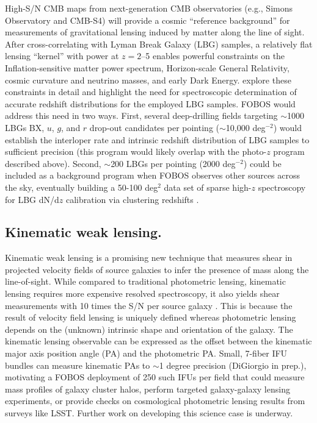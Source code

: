 High-S/N CMB maps from next-generation CMB observatories (e.g., Simons Observatory and CMB-S4) will provide a cosmic
``reference background'' for measurements of gravitational lensing induced by matter along the line of sight.  After
cross-correlating with Lyman Break Galaxy (LBG) samples, a relatively flat lensing ``kernel'' with power at $z = 2$--5
enables powerful constraints on the Inflation-sensitive matter power spectrum, Horizon-scale General Relativity, cosmic
curvature and neutrino masses, and early Dark Energy.  \citet{wilson19} explore these constraints in detail and
highlight the need for spectroscopic determination of accurate redshift distributions for the employed LBG samples.
FOBOS would address this need in two ways.  First, several deep-drilling fields targeting $\sim$1000 LBGs BX, $u$, $g$,
and $r$ drop-out candidates per pointing ($\sim$10,000 deg$^{-2}$) would establish the interloper rate and intrinsic
redshift distribution of LBG samples to sufficient precision (this program would likely overlap with the photo-$z$
program described above).  Second, $\sim$200 LBGs per pointing (2000 deg$^{-2}$) could be included as a background
program when FOBOS observes other sources across the sky, eventually building a 50-100 deg$^2$ data set of sparse
high-$z$ spectroscopy for LBG dN/d$z$ calibration via clustering redshifts \citep[see][]{wilson19}.


\subsection{Kinematic weak lensing.}
\label{sec:kinematic_lensing}

Kinematic weak lensing is a promising new technique that measures shear in projected velocity fields of source galaxies to infer the presence of mass along the line-of-sight.  While compared to traditional photometric lensing, kinematic lensing requires more expensive resolved spectroscopy, it also yields shear measurements with 10 times the S/N per source galaxy \citep{huff13}.  This is because the result of velocity field lensing is uniquely defined whereas photometric lensing depends on the (unknown) intrinsic shape and orientation of the galaxy.  The kinematic lensing observable can be expressed as the offset between the kinematic major axis position angle (PA) and the photometric PA.  Small, 7-fiber IFU bundles can measure kinematic PAs to $\sim$1 degree precision (DiGiorgio in prep.), motivating a FOBOS deployment of 250 such IFUs per field that could measure mass profiles of galaxy cluster halos, perform targeted galaxy-galaxy lensing experiments, or provide checks on cosmological photometric lensing results from surveys like LSST.  Further work on developing this science case is underway. 



